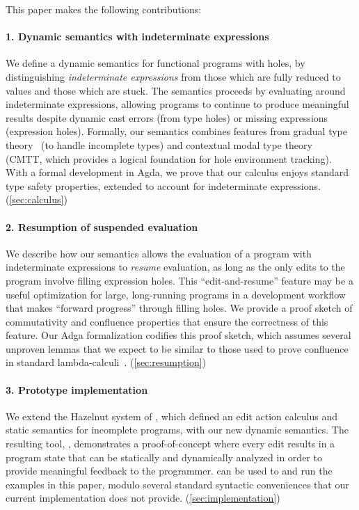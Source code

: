\newcommand{\contribution}[2]{\paragraph{#1. #2}}

This paper makes the following contributions:


%
\contribution{1}{Dynamic semantics with indeterminate expressions}
%
We define a dynamic semantics for functional programs with holes, by
distinguishing \emph{indeterminate expressions} from those which are fully
reduced to values and those which are stuck.
%
The semantics proceeds by evaluating around indeterminate expressions, allowing
programs to continue to produce meaningful results despite dynamic cast errors
(from type holes) or missing expressions (expression holes).
%
Formally, our semantics combines features from gradual type theory~\cite{XXX}
(to handle incomplete types) and contextual modal type theory~\cite{XXX} (CMTT,
which provides a logical foundation for hole environment tracking).
%
With a formal development in Agda, we prove that our calculus enjoys standard
type safety properties, extended to account for indeterminate expressions.
%
(\autoref{sec:calculus})

%
\contribution{2}{Resumption of suspended evaluation}
%
We describe how our semantics allows the evaluation of a program with
indeterminate expressions to \emph{resume} evaluation, as long as the only edits
to the program involve filling expression holes.
%
This ``edit-and-resume'' feature may be a useful optimization for large,
long-running programs in a development workflow that makes ``forward progress''
through filling holes.
%
We provide a proof sketch of commutativity and confluence properties that ensure
the correctness of this feature.
%
Our Adga formalization codifies this proof sketch, which assumes several
unproven lemmas that we expect to be similar to those used to prove confluence
in standard lambda-calculi~\cite{XXX}.
%
(\autoref{sec:resumption})

%
\contribution{3}{Prototype implementation}
%
We extend the Hazelnut system of \citet{popl-paper}, which defined an edit
action calculus and static semantics for incomplete programs, with our new
dynamic semantics.
%
The resulting tool, \HazelnutLive{}, demonstrates a proof-of-concept where every
edit results in a program state that can be statically and dynamically analyzed
in order to provide meaningful feedback to the programmer.
%
\HazelnutLive{} can be used to and run the examples in this paper, modulo
several standard syntactic conveniences that our current implementation does not
provide.
%
(\autoref{sec:implementation})


